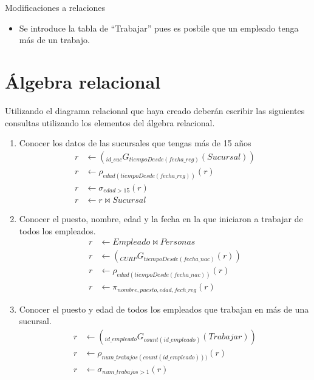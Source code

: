 \documentclass{article}
\begin{document}
    Modificaciones a relaciones
    \begin{itemize}
        \item Se introduce la tabla de ``Trabajar'' pues es posbile que un
        empleado tenga más de un trabajo.
    \end{itemize}
    
    \section{Álgebra relacional}
    Utilizando el diagrama relacional que haya creado deberán escribir las
    siguientes consultas utilizando los elementos del álgebra relacional.
    \begin{enumerate}
        \item {
            Conocer los datos de las sucursales que tengas más de 15 años
            \begin{align*}
                r &\leftarrow (_{id\_suc}G_{tiempoDesde(fecha\_reg)}(Sucursal)) \\
                r &\leftarrow \rho_{edad(tiempoDesde(fecha\_reg))}(r) \\
                r &\leftarrow \sigma_{edad > 15}(r) \\
                r &\leftarrow r \bowtie Sucursal
            \end{align*}
        }
        \item {
            Conocer el puesto, nombre, edad y la fecha en la que iniciaron a
            trabajar de todos los empleados.
            \begin{align*}
                r &\leftarrow Empleado \bowtie Personas \\
                r &\leftarrow (_{CURP}G_{tiempoDesde(fecha\_nac)}(r))\\
                r &\leftarrow \rho_{edad(tiempoDesde(fecha\_nac))}(r) \\
                r &\leftarrow \pi_{nombre, puesto, edad, fech\_reg}(r)
            \end{align*}
        }
        \item {
            Conocer el puesto y edad de todos los empleados que trabajan en más 
            de una sucursal.
            \begin{align*}
                r &\leftarrow (_{id\_empleado}G_{count(id\_empleado)}(Trabajar)) \\
                r &\leftarrow \rho_{num\_trabajos(count(id\_empleado)))}(r)\\
                r &\leftarrow \sigma_{num\_trabajos>1}(r)\\

\end{align*}}
\end{enumerate}
\end{document}
